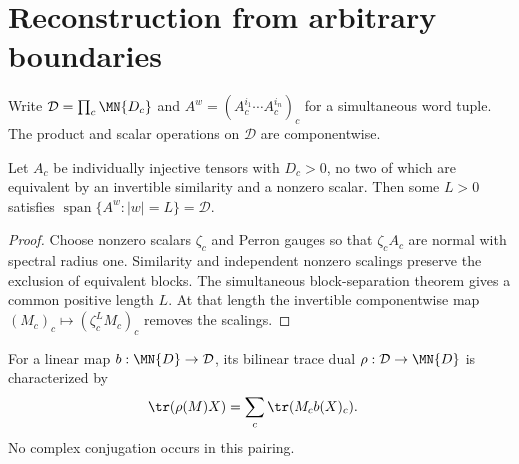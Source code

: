 
\section{Reconstruction from arbitrary boundaries}
\label{sec:glm_boundary_reconstruction}

Write $\mathcal D=\prod_c\MN{D_c}$ and
$A^w=(A_c^{i_1}\cdots A_c^{i_n})_c$ for a simultaneous word tuple.
The product and scalar operations on $\mathcal D$ are componentwise.

\begin{lemma}
    \label{thm:glm_boundary_spanning}
    \leanok
    Let $A_c$ be individually injective tensors with $D_c>0$, no two of
    which are equivalent by an invertible similarity and a nonzero scalar.
    Then some $L>0$ satisfies $\operatorname{span}\{A^w:|w|=L\}=\mathcal D$.
\end{lemma}
\begin{proof}
    \leanok
    Choose nonzero scalars $\zeta_c$ and Perron gauges so that
    $\zeta_cA_c$ are normal with spectral radius one. Similarity and
    independent nonzero scalings preserve the exclusion of equivalent
    blocks. The simultaneous block-separation theorem gives a common
    positive length $L$. At that length the invertible componentwise map
    $(M_c)_c\mapsto(\zeta_c^L M_c)_c$ removes the scalings.
\end{proof}

\begin{definition}
    \label{def:glm_boundary_trace_dual}
    \leanok
    For a linear map $b:\MN{D}\to\mathcal D$, its bilinear trace dual
    $\rho:\mathcal D\to\MN{D}$ is characterized by
    \begin{align}
        \tr(\rho(M)X) & =\sum_c\tr(M_c b(X)_c).
        \label{eq:glm_boundary_dual}
    \end{align}
    No complex conjugation occurs in this pairing.
\end{definition}

